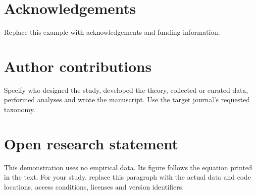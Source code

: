 \section*{Acknowledgements}
Replace this example with acknowledgements and funding information.
\section*{Author contributions}
Specify who designed the study, developed the theory, collected or curated data, performed analyses and wrote the manuscript. Use the target journal's requested taxonomy.
\section*{Open research statement}
This demonstration uses no empirical data. Its figure follows the equation printed in the text. For your study, replace this paragraph with the actual data and code locations, access conditions, licenses and version identifiers.
